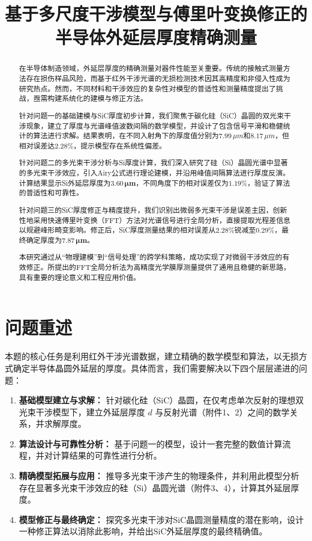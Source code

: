 \documentclass[withoutpreface,bwprint]{cumcmthesis} %
\title{基于多尺度干涉模型与傅里叶变换修正的半导体外延层厚度精确测量}
\begin{document}
\maketitle
\begin{abstract}
    在半导体制造领域，外延层厚度的精确测量对器件性能至关重要。传统的接触式测量方法存在损伤样品风险，而基于红外干涉光谱的无损检测技术因其高精度和非侵入性成为研究热点。然而，不同材料和干涉效应的复杂性对模型的普适性和测量精度提出了挑战，亟需构建系统化的建模与修正方法。

    针对问题一的基础建模与SiC厚度初步计算，我们聚焦于碳化硅（SiC）晶圆的双光束干涉现象，建立了厚度与光谱峰值波数间隔的数学模型，并设计了包含信号平滑和稳健统计的算法进行求解。结果表明，在不同入射角下的厚度值分别为$7.99\,\mu m$和$8.17\,\mu m$，但相对误差达$2.28\%$，提示模型存在系统性偏差。

    针对问题二的多光束干涉分析与Si厚度计算，我们深入研究了硅（Si）晶圆光谱中显著的多光束干涉效应，引入Airy公式进行理论建模，并沿用峰值间隔算法进行厚度反演。计算结果显示Si外延层厚度为$\mathbf{3.60\,\mu m}$，不同角度下的相对误差仅为$1.19\%$，验证了算法的普适性和可靠性。

    针对问题三的SiC厚度修正与精度提升，我们识别出微弱多光束干涉是误差主因，创新性地采用快速傅里叶变换（FFT）方法对光谱信号进行全局分析，直接提取光程差信息以规避峰形畸变影响。修正后，SiC厚度测量结果的相对误差从$2.28\%$锐减至$\mathbf{0.29\%}$，最终确定厚度为$\mathbf{7.87\,\mu m}$。

    本研究通过从“物理建模”到“信号处理”的跨学科策略，成功实现了对微弱干涉效应的有效修正。所提出的FFT全局分析法为高精度光学膜厚测量提供了通用且稳健的新思路，具有重要的理论意义和工程应用价值。

    \end{abstract}


\section{问题重述}
本题的核心任务是利用红外干涉光谱数据，建立精确的数学模型和算法，以无损方式确定半导体晶圆外延层的厚度。具体而言，我们需要解决以下四个层层递进的问题：
\begin{enumerate}
    \item \textbf{基础模型建立与求解：} 针对碳化硅（SiC）晶圆，在仅考虑单次反射的理想双光束干涉模型下，建立外延层厚度 $d$ 与反射光谱（附件1、2）之间的数学关系，并求解厚度。
    \item \textbf{算法设计与可靠性分析：} 基于问题一的模型，设计一套完整的数值计算流程，并对计算结果的可靠性进行分析。
    \item \textbf{精确模型拓展与应用：} 推导多光束干涉产生的物理条件，并利用此模型分析存在显著多光束干涉效应的硅（Si）晶圆光谱（附件3、4），计算其外延层厚度。
    \item \textbf{模型修正与最终确定：} 探究多光束干涉对SiC晶圆测量精度的潜在影响，设计一种修正算法以消除此影响，并给出SiC外延层厚度的最终精确值。
\end{enumerate}
\end{document}
